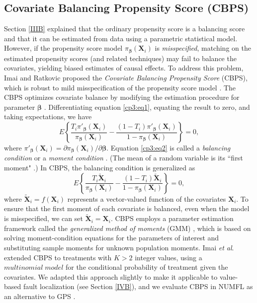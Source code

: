 \subsection{Covariate Balancing Propensity Score (CBPS)}\label{IIID}
Section \ref{IIIB} explained that the ordinary propensity score is a balancing score and that it can be estimated from data using a parametric statistical model.  However, if the propensity score model ${\pi _{\pmb \beta} }({\pmb{X}_i})$  is {\it misspecified}, matching on the estimated propensity scores (and related techniques) may fail to balance the covariates, yielding biased estimates of causal effects. To address this problem, Imai and Ratkovic proposed the {\it Covariate Balancing Propensity Score} (CBPS), which is robust to mild misspecification of the propensity score model \cite{Imai2014}.
The CBPS optimizes covariate balance by modifying the estimation procedure for parameter $\pmb{\beta}$ .  Differentiating equation \eqref{cp3:eq1}, equating the result to zero, and taking expectations, we have \cite{Imai2014}
\begin{equation}\label{cp3:eq2}
E\left\{ {\frac{{{T_i}{{\pi '}_{\pmb \beta} }({\pmb{X}_i})}}{{{\pi _{\pmb \beta} }({\pmb{X}_i})}} - \frac{{(1 - {T_i}){{\pi '}_{\pmb \beta} }({\pmb{X}_i})}}{{1 - {\pi _{\pmb \beta} }({\pmb{X}_i})}}} \right\} = 0,
\end{equation}
where ${\pi '_{\pmb \beta} }({\pmb{X}_i}) = \partial {\pi _{\pmb \beta} }({\pmb{X}_i})/\partial \pmb{\beta}$.  Equation \eqref{cp3:eq2} is called a {\it balancing condition} or a {\it moment condition} \cite{Imai2014}.  (The mean of a random variable is its ``first moment" \cite{Rosenblueth1981}.)  In CBPS, the balancing condition is generalized as
\begin{equation}\label{cp3:eq3}
E\left\{ {\frac{{{T_i}{{\tilde {\pmb X}}_i}}}{{{\pi _{\pmb \beta} }({\pmb{X}_i})}} - \frac{{(1 - {T_i}){{\tilde {\pmb X}}_i}}}{{1 - {\pi _{\pmb \beta} }({\pmb{X}_i})}}} \right\} = 0,
\end{equation}
where ${\tilde {\pmb X}_i} = f({\pmb{X}_i})$ represents a vector-valued function of the covariates $\pmb{X}_i$. To ensure that the first moment of each covariate is balanced, even when the model is misspecified, we can set ${\tilde {\pmb X}_i} = {\pmb{X}_i}$. CBPS employs a parameter estimation framework called the {\it generalized method of moments} (GMM) \cite{Hansen1982}, which is based on solving moment-condition equations for the parameters of interest and substituting sample moments for unknown population moments. Imai {\it et al}. extended CBPS to treatments with $K>2$ integer values, using a $multinomial\;model$ for the conditional probability of treatment given the covariates. We adapted this approach slightly to make it applicable to value-based fault localization (see Section \ref{IVB}), and we evaluate CBPS in NUMFL as an alternative to GPS .

